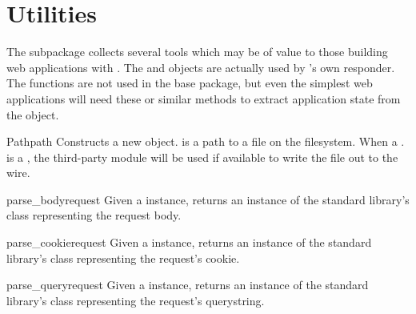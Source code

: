 \section{Utilities \label{utils}}

The  subpackage collects several tools which may be of value
to those building web applications with . The  and
 objects are actually used by 's own
 responder. The  functions are not used in the
base package, but even the simplest web applications will need these or similar
methods to extract application state from the  object.


\begin{classdesc}{Path}{path}
Constructs a new  object.  is a path to a file on the
filesystem. When a . is a , the
third-party
module will be used if available to write the file out to the wire.
\end{classdesc}



\begin{funcdesc}{parse_body}{request}
Given a  instance, returns an instance of the standard library's
 class
representing the request body.
\end{funcdesc}

\begin{funcdesc}{parse_cookie}{request}
Given a  instance, returns an instance of the standard library's
 class
representing the request's cookie.
\end{funcdesc}

\begin{funcdesc}{parse_query}{request}
Given a  instance, returns an instance of the standard library's
 class
representing the request's querystring.
\end{funcdesc}



